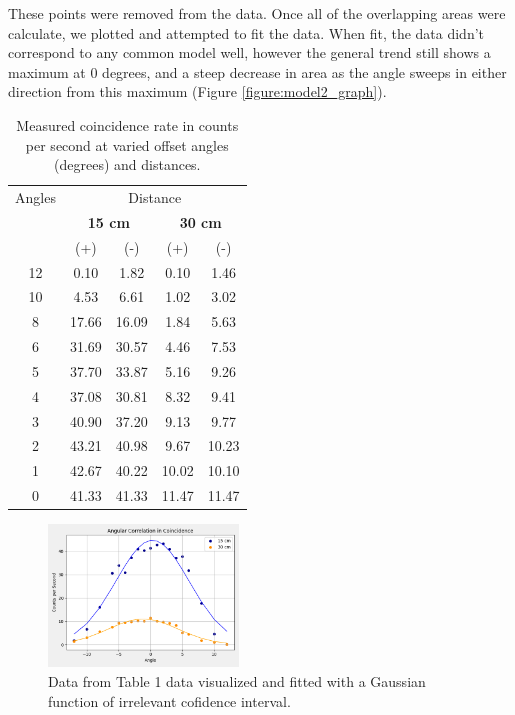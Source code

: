 \documentclass[12pt, letterpaper, twocolumn]{article}
\newcommand\mcc[1]{\multicolumn{2}{c}{#1}}
\begin{document}
These points were removed from the data. Once all of the overlapping areas were
calculate, we plotted and attempted to fit the data. When fit, the data didn't
correspond to any common model well, however the general trend still shows a
maximum at 0 degrees, and a steep decrease in area as the angle sweeps in
either direction from this maximum (Figure \ref{figure:model2_graph}).
\begin{table}[H]
\centering
\begin{tabular}{ccccc}
\toprule
{Angles} & \multicolumn{4}{c}{Distance}\\\cmidrule{2-5}
& \mcc{\textbf{15 cm}}
& \mcc{\textbf{30 cm}}\\
\cmidrule{2-3} \cmidrule{4-5}
& {(+)}  & {(-)} & {(+)} & {(-)} \\
\midrule
12 & 0.10 & 1.82 & 0.10 & 1.46\\\hline
10 & 4.53 & 6.61 & 1.02 & 3.02\\\hline
8 & 17.66 & 16.09 & 1.84 & 5.63\\\hline
6 & 31.69 & 30.57 & 4.46 & 7.53\\\hline
5 & 37.70 & 33.87 & 5.16 & 9.26\\\hline
4 & 37.08 & 30.81 & 8.32 & 9.41\\\hline
3 & 40.90 & 37.20 & 9.13 & 9.77\\\hline
2 & 43.21 & 40.98 & 9.67 & 10.23\\\hline
1 & 42.67 & 40.22 & 10.02 & 10.10\\\hline
0 & 41.33 & 41.33 & 11.47 & 11.47\\\hline
\bottomrule
\end{tabular}
\caption{Measured coincidence rate in counts per second at varied offset angles (degrees) and distances.}
\label{table:model_1_table}
\end{table}
\begin{figure}[H]
    \centering
    \includegraphics[width=0.45\textwidth]{Figures/coincidence_gauss_fit.png}
    \caption{Data from Table 1 data visualized and fitted with a Gaussian
    function of irrelevant cofidence interval.}
    \label{figure:model1_graph}
\end{figure}
\end{document}
